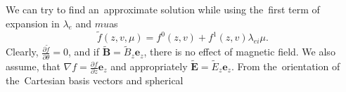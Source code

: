 \documentclass[preprint,12pt]{elsarticle}
\newcommand{\pdv}[2]{\frac{\partial{#1}}{\partial{#2}}}
\newcommand{\vect}[1]{\boldsymbol{#1}}
\newcommand{\mfpe}{\lambda_e}
\newcommand{\mfpei}{\lambda_{ei}}
\newcommand{\Zbar}{\bar{Z}}
\newcommand{\vmag}{v}
\newcommand{\vth}{v_{th}}
\newcommand{\tE}{\vect{\tilde{E}}}
\newcommand{\tB}{\vect{\tilde{B}}}
\newcommand{\fM}{f_M}
\newcounter{bla}
\begin{document}
 %
We can try to find an~approximate solution while using the~first term of
expansion in $\mfpe$ and $mu$as
\begin{equation}
  \tilde{f}(z, \vmag, \mu) = f^0(z, \vmag) + f^1(z, \vmag) \mfpei\mu .
  \label{eq:f_approximation}
\end{equation}
Clearly, $\pdv{\tilde{f}}{\theta} = 0$, and if $\tB = \tilde{B}_z\vect{e}_z$, 
there is no effect of magnetic field. We also assume, that 
$\nabla f = \pdv{f}{z}\vect{e}_z$ and appropriately 
$\tE = \tilde{E}_z\vect{e}_z$.
From the~orientation of the~Cartesian basis vectors and spherical 
\end{document}
